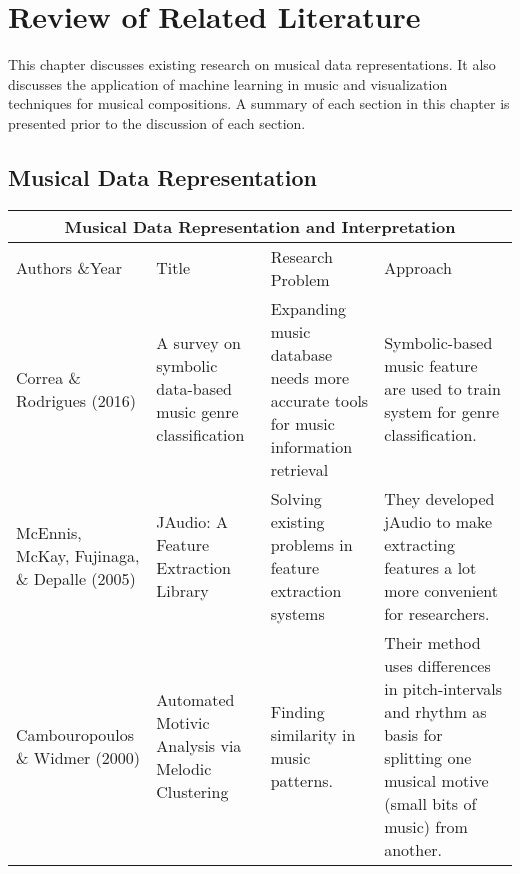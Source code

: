 %
%
%                 

\chapter{Review of Related Literature}
\label{sec:relatedlit}
This chapter discusses existing research on musical data representations. It also discusses the application of machine learning in music and visualization techniques for musical compositions. A summary of each section in this chapter is presented prior to the discussion of each section.

\section{Musical Data Representation}
 
\begin{center}
\begin{tabular}{ |p{3cm}|p{3cm}|p{3cm}|p{3cm}| }
 \hline
 \multicolumn{4}{|c|}{Musical Data Representation and Interpretation} \\
 \hline
 Authors \&Year &Title&Research Problem&Approach\\
 \hline
 Correa \& Rodrigues (2016)& A survey on symbolic data-based music genre classification & Expanding music database needs more accurate tools for music information retrieval & Symbolic-based music feature are used to train system for genre classification.\\
\hline
McEnnis, McKay, Fujinaga, \& Depalle (2005)& JAudio: A Feature Extraction Library&Solving existing problems in feature extraction systems & They developed jAudio to make extracting features a lot more convenient for researchers.\\
\hline
  Cambouropoulos \& Widmer (2000)& Automated Motivic Analysis via Melodic Clustering & Finding similarity in music patterns. & Their method uses differences in pitch-intervals and rhythm as basis for splitting one musical motive (small bits of music) from another.\\
 \hline
\end{tabular}
\end{center}


